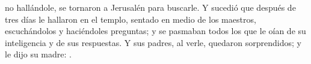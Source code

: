  no hallándole, se tornaron a Jerusalén para buscarle. Y sucedió que después de tres días le hallaron en el templo,
sentado en medio de los maestros, escuchándolos y haciéndoles preguntas; y se pasmaban todos los que le oían de su inteligencia y de sus respuestas.
Y sus padres, al verle, quedaron sorprendidos; y le dijo su madre: . 